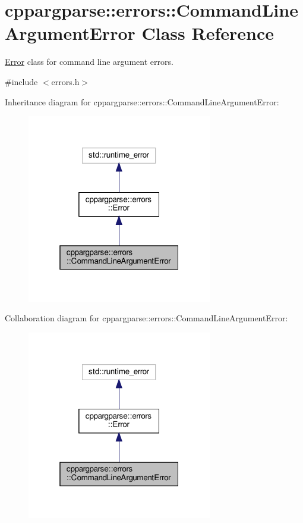 \hypertarget{classcppargparse_1_1errors_1_1CommandLineArgumentError}{}\section{cppargparse\+:\+:errors\+:\+:Command\+Line\+Argument\+Error Class Reference}
\label{classcppargparse_1_1errors_1_1CommandLineArgumentError}


\hyperlink{classcppargparse_1_1errors_1_1Error}{Error} class for command line argument errors.  




{\ttfamily \#include $<$errors.\+h$>$}



Inheritance diagram for cppargparse\+:\+:errors\+:\+:Command\+Line\+Argument\+Error\+:
\nopagebreak
\begin{figure}[H]
\begin{center}
\leavevmode
\includegraphics[width=229pt]{classcppargparse_1_1errors_1_1CommandLineArgumentError__inherit__graph}
\end{center}
\end{figure}


Collaboration diagram for cppargparse\+:\+:errors\+:\+:Command\+Line\+Argument\+Error\+:
\nopagebreak
\begin{figure}[H]
\begin{center}
\leavevmode
\includegraphics[width=229pt]{classcppargparse_1_1errors_1_1CommandLineArgumentError__coll__graph}
\end{center}
\end{figure}

